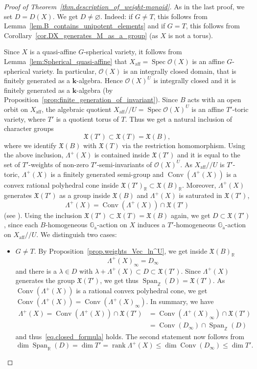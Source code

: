 \documentclass[JEP,XML,SOM,Unicode]{cedram}
\let\mathcal\mathscr
\newcommand{\ra}{\mathrm{a}}
\theoremstyle{plain}
\theoremstyle{definition}
\DeclareMathOperator{\Spec}{Spec}
\DeclareMathOperator{\rank}{rank}
\DeclareMathOperator{\aff}{aff}
\DeclareMathOperator{\Conv}{Conv}
\DeclareMathOperator{\Span}{Span}
\newcommand{\OO}{\mathcal{O}}
\newcommand{\GG}{\mathbb{G}}
\newcommand{\RR}{\mathbb{R}}
\newcommand{\ZZ}{\mathbb{Z}}
\newcommand{\kk}{{\boldsymbol{k}}}
\newcommand{\aquot}{/ \! \! /}
\begin{document}
\begin{proof}[Proof of Theorem~\ref{thm.description_of_weight-monoid}]
As in the last proof, we set $D = D(X)$. We get $D \neq \varnothing$. Indeed: if $G \neq T$, this follows
from Lemma~\ref{lem.B_contains_unipotent_elements} and if $G = T$, this follows from Corollary~\ref{cor.DX_generates_M_as_a_group} (as $X$ is not a torus).

Since $X$ is a quasi-affine $G$-spherical variety, it follows from Lemma~\ref{lem:Spherical_quasi-affine}
that $X_{\aff} = \Spec \OO(X)$ is an affine $G$-spherical variety.
In particular, $\OO(X)$ is an integrally closed domain, that is finitely generated as a $\kk$-algebra.
Hence $\OO(X)^U$ is integrally closed and
it is finitely generated as a $\kk$-algebra (by Proposition~\ref{prop:finite_generation_of_invariant}).
Since $B$ acts with an open orbit on $X_{\aff}$, the algebraic quotient
$X_{\aff} \aquot U = \Spec \OO(X)^U$ is an affine $T'$-toric variety, where $T'$ is a quotient torus
of $T$. Thus we get a natural inclusion of character groups
\[
\mathfrak{X}(T') \subset \mathfrak{X}(T) = \mathfrak{X}(B),
\]
where we identify $\mathfrak{X}(B)$ with $\mathfrak{X}(T)$ via the restriction homomorphism.
Using the above inclusion, $\Lambda^+(X)$ is contained
inside $\mathfrak{X}(T')$ and it is equal to the set of $T'$-weights of non-zero $T'$-semi-invariants
of $\OO(X)^U$. As $X_{\aff} \aquot U$ is $T'$-toric, $\Lambda^+(X)$ is a finitely generated semi-group and $\Conv(\Lambda^+(X))$
is a convex rational polyhedral cone inside $\mathfrak{X}(T')_{\RR} \subset \mathfrak{X}(B)_{\RR}$.
Moreover, $\Lambda^+(X)$ generates $\mathfrak{X}(T')$ as a group inside $\mathfrak{X}(B)$ and
$\Lambda^+(X)$ is saturated in $\mathfrak{X}(T')$, \ie
\[
\Lambda^+(X) = \Conv(\Lambda^+(X)) \cap \mathfrak{X}(T')
\]
(see \cite[Ex.\,1.3.4\,(a)]{CoLiSc2011Toric-varieties}). Using the inclusion
$\mathfrak{X}(T') \subset \mathfrak{X}(T) = \mathfrak{X}(B)$ again, we get $D \subset \mathfrak{X}(T')$, since each
$B$-homogeneous $\GG_\ra$-action on $X$ induces a $T'$-homogeneous $\GG_\ra$-action on
$X_{\aff} \aquot U$. We distinguish two cases:

\begin{itemize}
\item $G \neq T$. By Proposition~\ref{prop.weights_Vec_ln^U}, we get inside $\mathfrak{X}(B)_{\RR}$
\[
\Lambda^+(X)_{\infty} = D_{\infty}
\]
and there is a $\lambda \in D$ with $\lambda + \Lambda^+(X) \subset D \subset \mathfrak{X}(T')$.
Since $\Lambda^+(X)$ generates the group $\mathfrak{X}(T')$, we get thus $\Span_{\ZZ}(D) = \mathfrak{X}(T')$.
As $\Conv(\Lambda^+(X))$ is a rational convex polyhedral cone, we get
$\Conv(\Lambda^+(X)) = \Conv(\Lambda^+(X)_{\infty})$.
In summary, we have
\begin{align*}
\Lambda^+(X) = \Conv(\Lambda^+(X)) \cap \mathfrak{X}(T')
&= \Conv(\Lambda^+(X)_\infty) \cap \mathfrak{X}(T') \\
&= \Conv ( D_{\infty}) \cap \Span_{\ZZ}(D)
\end{align*}
and thus~\eqref{eq.closed_formula} holds. The second statement now follows from
\[
\dim \Span_{\RR}(D) = \dim T' = \rank \Lambda^+(X) \leq
\dim \Conv(D_\infty) \leq \dim T'.
\]


\end{itemize}
\end{proof}
\end{document}
